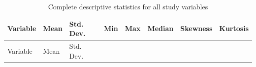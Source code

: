 \documentclass[
  letterpaper,
  oneside,
  openany]{MastersDoctoralThesis}
\theoremstyle{plain}
\theoremstyle{remark}
\begin{document}
\begin{longtable}[]{@{}
  >{\raggedright\arraybackslash}p{}
  >{\raggedright\arraybackslash}p{}
  >{\raggedright\arraybackslash}p{}
  >{\raggedright\arraybackslash}p{}
  >{\raggedright\arraybackslash}p{}
  >{\raggedright\arraybackslash}p{}
  >{\raggedright\arraybackslash}p{}
  >{\raggedright\arraybackslash}p{}@{}}
\caption{Complete descriptive statistics for all study
variables}\label{tbl-app-b-full}\tabularnewline
\toprule\noalign{}
\begin{minipage}[b]{\linewidth}\raggedright
Variable
\end{minipage} & \begin{minipage}[b]{\linewidth}\raggedright
Mean
\end{minipage} & \begin{minipage}[b]{\linewidth}\raggedright
Std. Dev.
\end{minipage} & \begin{minipage}[b]{\linewidth}\raggedright
Min
\end{minipage} & \begin{minipage}[b]{\linewidth}\raggedright
Max
\end{minipage} & \begin{minipage}[b]{\linewidth}\raggedright
Median
\end{minipage} & \begin{minipage}[b]{\linewidth}\raggedright
Skewness
\end{minipage} & \begin{minipage}[b]{\linewidth}\raggedright
Kurtosis
\end{minipage} \\
\midrule\noalign{}
\endfirsthead
\toprule\noalign{}
\begin{minipage}[b]{\linewidth}\raggedright
Variable
\end{minipage} & \begin{minipage}[b]{\linewidth}\raggedright
Mean
\end{minipage} & \begin{minipage}[b]{\linewidth}\raggedright
Std. Dev.
\end{minipage} & \begin{minipage}[b]{\linewidth}\raggedright

\end{minipage}
\end{longtable}
\end{document}

